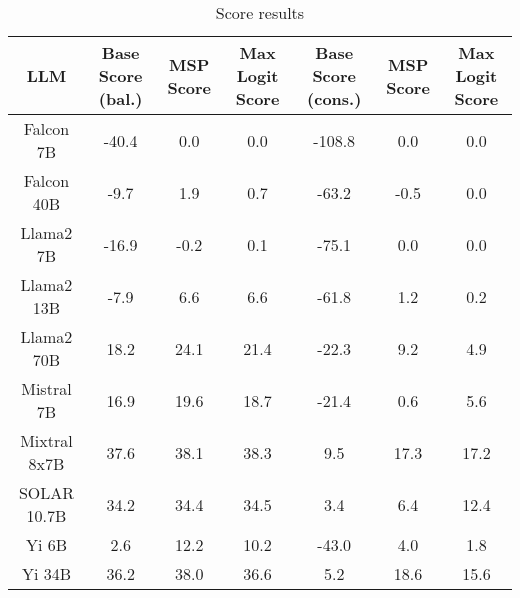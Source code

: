 \renewcommand\arraystretch{1.2}
\begin{table*}
\centering
\begin{tabular}{c|c|c|c|c|c|c}
LLM & Base Score (bal.) & MSP Score & Max Logit Score & Base Score (cons.) & MSP Score & Max Logit Score\\ \hline
Falcon 7B & -40.4 & 0.0 & 0.0 & -108.8 & 0.0 & 0.0\\
Falcon 40B & -9.7 & 1.9 & 0.7 & -63.2 & -0.5 & 0.0\\
Llama2 7B & -16.9 & -0.2 & 0.1 & -75.1 & 0.0 & 0.0\\
Llama2 13B & -7.9 & 6.6 & 6.6 & -61.8 & 1.2 & 0.2\\
Llama2 70B & 18.2 & 24.1 & 21.4 & -22.3 & 9.2 & 4.9\\
Mistral 7B & 16.9 & 19.6 & 18.7 & -21.4 & 0.6 & 5.6\\
Mixtral 8x7B & 37.6 & 38.1 & 38.3 & 9.5 & 17.3 & 17.2\\
SOLAR 10.7B & 34.2 & 34.4 & 34.5 & 3.4 & 6.4 & 12.4\\
Yi 6B & 2.6 & 12.2 & 10.2 & -43.0 & 4.0 & 1.8\\
Yi 34B & 36.2 & 38.0 & 36.6 & 5.2 & 18.6 & 15.6\\
\hline
\end{tabular}
\caption{Score results}
\end{table*}
\label{tab:score}
